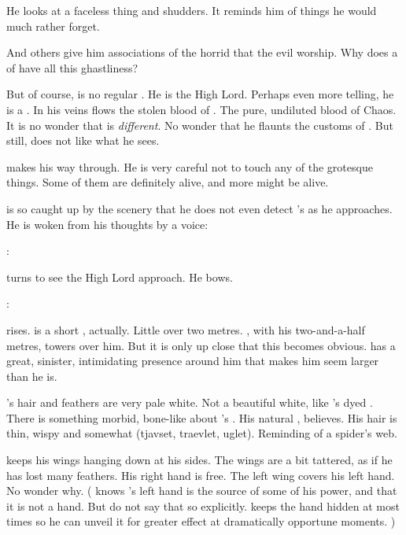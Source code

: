 He looks at a faceless thing and shudders. 
It reminds him of things he would much rather forget. 

And others give him associations of the horrid \xss that the evil \dragons worship. 
Why does a \resphan of \CiriathSepher have all this ghastliness?

But of course, \Azraid is no regular \resphan. 
He is the High Lord. 
Perhaps even more telling, he is a \sathariah. 
In his veins flows the stolen blood of \dragons. 
The pure, undiluted blood of Chaos. 
It is no wonder that \Azraid is \emph{different}.
No wonder that he flaunts the customs of \CiriathSepher. 
But still, \Teshrial does not like what he sees. 

\Teshrial makes his way through.
He is very careful not to touch any of the grotesque things.
Some of them are definitely alive, and more might be alive. 

\Teshrial is so caught up by the scenery that he does not even detect \Azraid's \vertex as he approaches. 
He is woken from his thoughts by a voice:

\Azraid: 

\Teshrial turns to see the High Lord approach.
He bows. 

\Azraid: 

\Teshrial rises. 
\Azraid is a short \resphan, actually. 
Little over two metres. 
\Teshrial, with his two-and-a-half metres, towers over him.
But it is only up close that this becomes obvious. 
\Azraid has a great, sinister, intimidating presence around him that makes him seem larger than he is. 

\Azraid's hair and feathers are very pale white. 
Not a beautiful white, like \Teshrial's dyed \colour. 
There is something morbid, bone-like about \Azraid's \colour. 
His natural \colour, \Teshrial believes. 
His hair is thin, wispy and somewhat (tjavset, traevlet, uglet). 
Reminding of a spider's web. 

\Azraid keeps his wings hanging down at his sides. 
The wings are a bit tattered, as if he has lost many feathers. 
His right hand is free. 
The left wing covers his left hand. 
No wonder why. 
(%
  \Teshrial knows \Azraid's left hand is the source of some of his power, and that it is not a \resphan hand. 
  But do not say that so explicitly. 
  \Azraid keeps the hand hidden at most times so he can unveil it for greater effect at dramatically opportune moments.%
)

